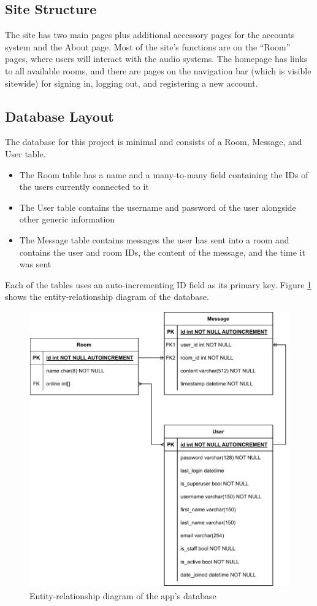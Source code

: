 \subsection{Site Structure}
The site has two main pages plus additional accessory pages for the accounts system and the About page. Most of the site’s functions are on the “Room” pages, where users will interact with the audio systems. The homepage has links to all available rooms, and there are pages on the navigation bar (which is visible sitewide) for signing in, logging out, and registering a new account.

\subsection{Database Layout}
The database for this project is minimal and consists of a Room, Message, and User table.
\begin{itemize}
    \item 
        The Room table has a name and a many-to-many field containing the IDs of the users currently connected to it
    \item 
        The User table contains the username and password of the user alongside other generic information
    \item 
        The Message table contains messages the user has sent into a room and contains the user and room IDs, the content of the message, and the time it was sent
\end{itemize}
Each of the tables uses an auto-incrementing ID field as its primary key. Figure \ref{fig:erd} shows the entity-relationship diagram of the database.

\begin{figure}[htb]
    \centering
    \includegraphics[width=0.5\linewidth]{images/design/entity-relation.pdf}    
    \caption{Entity-relationship diagram of the app's database}
    \label{fig:erd}
\end{figure}

